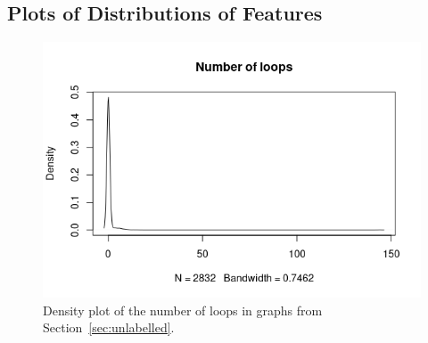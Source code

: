 \documentclass{l4proj}
\theoremstyle{definition}
\theoremstyle{remark}
\begin{document}
\begin{appendices}
  \chapter{Plots of Distributions of Features} \label{appendix:plots}
  \begin{figure}
    \centering
    \includegraphics[scale=0.7]{images/sip_loops.png}
    \caption{Density plot of the number of loops in graphs from
      Section~\ref{sec:unlabelled}.}
    \label{fig:loops}
  \end{figure}


\end{appendices}
\end{document}
